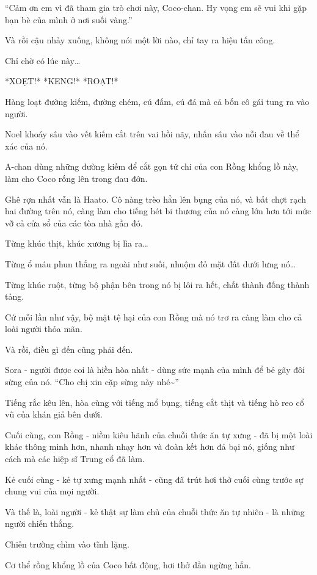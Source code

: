 \documentclass[../main.tex]{subfiles}
\begin{document}
``Cảm ơn em vì đã tham gia trò chơi này, Coco-chan. Hy vọng em sẽ vui khi gặp bạn bè của mình ở nơi suối vàng.''

Và rồi cậu nhảy xuống, không nói một lời nào, chỉ tay ra hiệu tấn công.

Chỉ chờ có lúc này\dots

*XOẸT!* *KENG!* *ROẠT!*

Hàng loạt đường kiếm, đường chém, cú đấm, cú đá mà cả bốn cô gái tung ra vào người.

Noel khoáy sâu vào vết kiếm cắt trên vai hồi nãy, nhấn sâu vào nỗi đau về thể xác của nó.

A-chan dùng những đường kiếm để cắt gọn tứ chi của con Rồng khổng lồ này, làm cho Coco rống lên trong đau đớn.

Ghê rợn nhất vẫn là Haato. Cô nàng trèo hẳn lên bụng của nó, và bất chợt rạch hai đường trên nó, càng làm cho tiếng hét bi thương của nó càng lớn hơn tới mức vỡ cả cửa sổ của các tòa nhà gần đó.

Từng khúc thịt, khúc xương bị lìa ra\dots

Từng ổ máu phun thẳng ra ngoài như suối, nhuộm đỏ mặt đất dưới lưng nó\dots

Từng khúc ruột, từng bộ phận bên trong nó bị lôi ra hết, chất thành đống thành tảng.

Cứ mỗi lần như vậy, bộ mặt tệ hại của con Rồng mà nó trơ ra càng làm cho cả loài người thỏa mãn.

Và rồi, điều gì đến cũng phải đến.

Sora - người được coi là hiền hòa nhất - dùng sức mạnh của mình để bẻ gãy đôi sừng của nó. ``Cho chị xin cặp sừng này nhé\~{}''

Tiếng rắc kêu lên, hòa cùng với tiếng mổ bụng, tiếng cắt thịt và tiếng hò reo cổ vũ của khán giả bên dưới.

Cuối cùng, con Rồng - niềm kiêu hãnh của chuỗi thức ăn tự xưng - đã bị một loài khác thông minh hơn, nhanh nhạy hơn và đoàn kết hơn đả bại nó, giống như cách mà các hiệp sĩ Trung cổ đã làm.

Kẻ cuối cùng - kẻ tự xưng mạnh nhất - cũng đã trút hơi thở cuối cùng trước sự chung vui của mọi người.

Và thế là, loài người - kẻ thật sự làm chủ của chuỗi thức ăn tự nhiên - là những người chiến thắng.

\ct

Chiến trường chìm vào tĩnh lặng.

Cơ thể rồng khổng lồ của Coco bất động, hơi thở dần ngừng hẳn.
\end{document}
